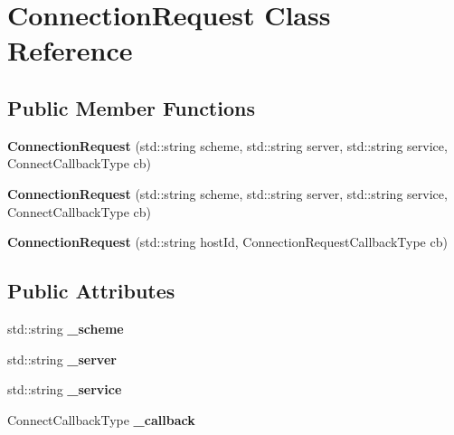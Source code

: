 \hypertarget{class_connection_request}{}\section{Connection\+Request Class Reference}
\label{class_connection_request}
\subsection*{Public Member Functions}
\begin{DoxyCompactItemize}
\item 
\mbox{\label{class_connection_request_a8fcda439275940ab6ce76fa11513f936}} 
{\bfseries Connection\+Request} (std\+::string scheme, std\+::string server, std\+::string service, Connect\+Callback\+Type cb)
\item 
\mbox{\label{class_connection_request_a8fcda439275940ab6ce76fa11513f936}} 
{\bfseries Connection\+Request} (std\+::string scheme, std\+::string server, std\+::string service, Connect\+Callback\+Type cb)
\item 
\mbox{\label{class_connection_request_a5db5ffeaf535b588d3d78b416395cc75}} 
{\bfseries Connection\+Request} (std\+::string host\+Id, Connection\+Request\+Callback\+Type cb)
\end{DoxyCompactItemize}
\subsection*{Public Attributes}
\begin{DoxyCompactItemize}
\item 
\mbox{\label{class_connection_request_ad3fb8a25086c021d65c0fa66c2e5b83c}} 
std\+::string {\bfseries \+\_\+scheme}
\item 
\mbox{\label{class_connection_request_a76fd8c69232cb1355f14afc88ab7451e}} 
std\+::string {\bfseries \+\_\+server}
\item 
\mbox{\label{class_connection_request_a25c410eaa9b1890bce9bbffb2b33fc6d}} 
std\+::string {\bfseries \+\_\+service}
\item 
\mbox{\label{class_connection_request_a849789e01011a6ac57a2adc4363a0071}} 
Connect\+Callback\+Type {\bfseries \+\_\+callback}
\end{DoxyCompactItemize}


